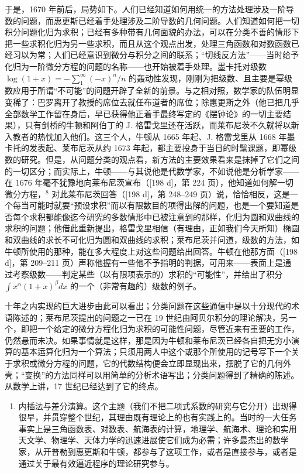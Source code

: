 于是，1670 年前后，局势如下。人们已经知道如何用统一的方法处理涉及一阶导数的问题，而惠更斯已经着手处理涉及二阶导数的几何问题。人们知道如何把一切积分问题化归为求积；已经有多种带有几何面貌的办法，可以在分类不善的情形下把一些求积化归为另一些求积，而且从这个观点出发，处理三角函数和对数函数已经习以为常；人们已经意识到微分与积分之间的联系；“切线反方法”——当时给予化归为一阶微分方程的问题的名称——也开始被着手处理。墨卡托对级数 \(\log(1+x) = -\sum_{1}^{\infty}(-x)^{n}/n\) 的轰动性发现，刚刚为把级数、且主要是幂级数应用于所谓“不可能”的问题开辟了全新的前景。与之相对照，数学家的队伍明显变稀了：巴罗离开了教授的席位去就任布道者的席位；除惠更斯之外（他已把几乎全部数学工作留在身后，早已获得他正着手最终写定的《摆钟论》的一切主要结果），只有剑桥的牛顿和阿伯丁的 J. 格雷戈里还在活跃，而莱布尼茨不久就将以新入教者的热忱加入他们。这三个人，牛顿从 1665 年起、J. 格雷戈里从 1668 年墨卡托的发表起、莱布尼茨从约 1673 年起，都主要投身于当日的时髦课题，即幂级数的研究。但是，从问题分类的观点看，新方法的主要效果看来是抹掉了它们之间的一切区分；而实际上，牛顿——与其说他是代数学家，不如说他是分析学家——在 1676 年毫不犹豫地向莱布尼茨宣布（{[}198 d{]}，第 224 页），他知道如何解一切微分方程，\(^{8}\) 对此莱布尼茨回答（{[}198 d{]}，第 248–249 页）说，恰恰相反，这是一个每当可能时就要“预设求积”而以有限数目的项得出解的问题，也是一个要知道是否每个求积都能像迄今研究的多数情形中已被注意到的那样，化归为圆和双曲线的求积的问题；他借此重新提出，格雷戈里相信（有理由，正如我们今天所知）椭圆和双曲线的求长不可化归为圆和双曲线的求积；莱布尼茨并问道，级数的方法，如牛顿所使用的那种，能在多大程度上对这些问题给出回答。牛顿在他那方面（{[}198 d{]}，第 209–211 页）声称他握有一些他不予指明的判据，可用来——表面上是通过考察级数——判定某些（以有限项表示的）求积的“可能性”，并给出了积分 \(\int x^{\alpha}(1 + x)^{\beta} dx\) 的一个（非常有趣的）级数的例子。

十年之内实现的巨大进步由此可以看出；分类问题在这些通信中是以十分现代的术语陈述的；莱布尼茨提出的问题之一已在 19 世纪由阿贝尔积分的理论解决，另一个，即把一个给定的微分方程化归为求积的可能性问题，尽管近来有重要的工作，仍然悬而未决。如果事情就是这样，那是因为牛顿和莱布尼茨已经各自把无穷小演算的基本运算化归为一个算法；只须用两人中这个或那个所使用的记号写下一个关于求积或微分方程的问题，它的代数结构便会立即显现出来，摆脱了它的几何外壳；“变换”的方法同样可以用简单的分析术语写出；分类问题得到了精确的陈述。从数学上讲，17 世纪已经达到了它的终点。

\begin{enumerate}
\def\labelenumi{\Alph{enumi})}
\setcounter{enumi}{4}
\tightlist
\item
  内插法与差分演算。这个主题（我们不把二项式系数的研究与它分开）出现得很早，并贯穿整个世纪，其理由既有理论上的也有实践上的。当时的一大任务事实上是三角函数表、对数表、航海表的计算，地理学、航海术、理论和实用天文学、物理学、天体力学的迅速进展使它们成为必需；许多最杰出的数学家，从开普勒到惠更斯和牛顿，都参与了这项工作，或者是直接参与，或者是通过关于最有效逼近程序的理论研究参与。
\end{enumerate}

